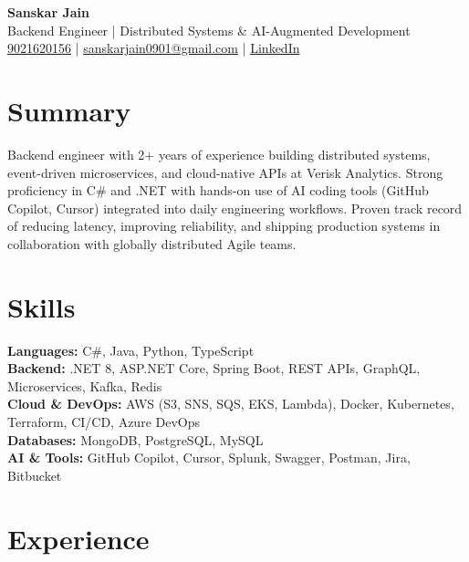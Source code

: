 \documentclass[letterpaper,10pt]{article}
\begin{document}
\begin{center}
    {\LARGE \textbf{Sanskar Jain}} \\
    \vspace{2pt}
    Backend Engineer | Distributed Systems \& AI-Augmented Development \\
    \vspace{2pt}
    \href{tel:9021620156}{9021620156} \;|\;
    \href{mailto:sanskarjain0901@gmail.com}{sanskarjain0901@gmail.com} \;|\;
    \href{https://www.linkedin.com/in/sanskar-jain0901/}{LinkedIn}
\end{center}

\vspace{3pt}

\section*{Summary}
Backend engineer with 2+ years of experience building distributed systems, event-driven microservices, and cloud-native APIs at Verisk Analytics.
Strong proficiency in C\# and .NET with hands-on use of AI coding tools (GitHub Copilot, Cursor) integrated into daily engineering workflows.
Proven track record of reducing latency, improving reliability, and shipping production systems in collaboration with globally distributed Agile teams.

\section*{Skills}
\textbf{Languages:} C\#, Java, Python, TypeScript \\
\textbf{Backend:} .NET 8, ASP.NET Core, Spring Boot, REST APIs, GraphQL, Microservices, Kafka, Redis \\
\textbf{Cloud \& DevOps:} AWS (S3, SNS, SQS, EKS, Lambda), Docker, Kubernetes, Terraform, CI/CD, Azure DevOps \\
\textbf{Databases:} MongoDB, PostgreSQL, MySQL \\
\textbf{AI \& Tools:} GitHub Copilot, Cursor, Splunk, Swagger, Postman, Jira, Bitbucket

\section*{Experience}
\end{document}
